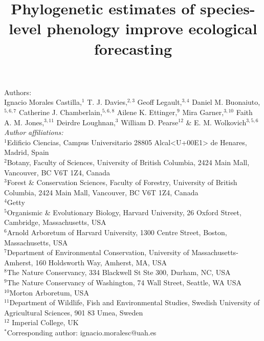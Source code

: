\documentclass[11pt]{article}
\title{Phylogenetic estimates of species-level phenology improve ecological forecasting}
\def\labelitemi{--}
\begin{document}



\maketitle

\noindent Authors:\\
Ignacio Morales Castilla,$^{1}$ T. J. Davies,$^{2,3}$ Geoff Legault,$^{3,4}$ Daniel M. Buonaiuto,$^{5,6,7}$ Catherine J. Chamberlain,$^{5,6,8}$ Ailene K. Ettinger,$^{9}$ Mira Garner,$^{3,10}$ Faith A. M. Jones,$^{3,11}$ Deirdre Loughnan,$^{3}$ William D. Pearse$^{12}$ \& E. M. Wolkovich$^{3,5,6}$  \vspace{2ex}\\
\emph{Author affiliations:}\\
$^{1}$Edificio Ciencias, Campus Universitario 28805 Alcal<U+00E1> de Henares, Madrid, Spain\\
 $^{2}$Botany, Faculty of Sciences, University of British Columbia, 2424 Main Mall, Vancouver, BC V6T 1Z4, Canada\\
$^{3}$Forest \& Conservation Sciences, Faculty of Forestry, University of British Columbia, 2424 Main Mall, Vancouver, BC V6T 1Z4, Canada\\
$^{4}$Getty\\
$^{5}$Organismic \& Evolutionary Biology, Harvard University, 26 Oxford Street, Cambridge, Massachusetts, USA\\
$^{6}$Arnold Arboretum of Harvard University, 1300 Centre Street, Boston, Massachusetts, USA\\
$^{7}$Department of Environmental Conservation, University of Massachusetts-Amherst, 160 Holdsworth Way, Amherst, MA, USA\\  %
 $^{8}$The Nature Conservancy, 334 Blackwell St Ste 300, Durham, NC, USA \\ %
$^{9}$The Nature Conservancy of Washington, 74 Wall Street, Seattle, WA  USA \\ %
$^{10}$Morton Arboretum, USA  \\ 
$^{11}$Department of Wildlife, Fish and Environmental Studies, Swedish University of Agricultural Sciences, 901 83 Umea, Sweden\\ %
$^{12}$ Imperial College, UK\\

\vspace{2ex}
$^*$Corresponding author: ignacio.moralesc@uah.es\\
\renewcommand{\thetable}{\arabic{table}}
\renewcommand{\thefigure}{\arabic{figure}}
\renewcommand{\labelitemi}{$-$}
\end{document}
